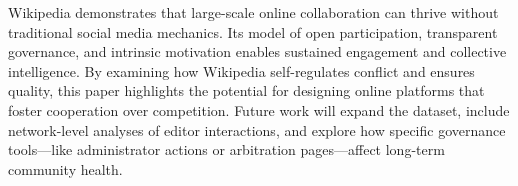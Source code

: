 
\label{sec:conclusion}
Wikipedia demonstrates that large-scale online collaboration can thrive without traditional social media mechanics. Its model of open participation, transparent governance, and intrinsic motivation enables sustained engagement and collective intelligence. By examining how Wikipedia self-regulates conflict and ensures quality, this paper highlights the potential for designing online platforms that foster cooperation over competition. Future work will expand the dataset, include network-level analyses of editor interactions, and explore how specific governance tools—like administrator actions or arbitration pages—affect long-term community health.
